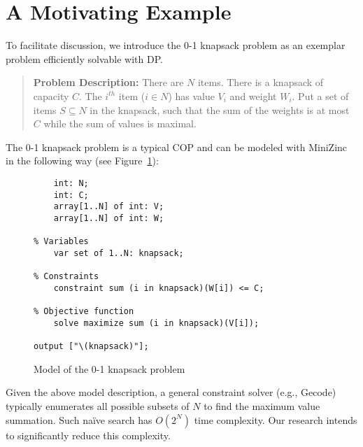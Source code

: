 \section{A Motivating Example}
	To facilitate discussion, we introduce the 0-1 knapsack problem as an exemplar problem efficiently solvable with DP. 
	
	
	\begin{quote}
		\textbf{Problem Description:} There are $N$ items. There is a knapsack of capacity $C$. The $i^{th}$ item ($i \in N$) has value $V_i$ and weight $W_i$. Put a set of items $S \subseteq N$ in the knapsack, such that the sum of the weights is at most $C$ while the sum of values is maximal.  
	\end{quote}
\noindent	
The 0-1 knapsack problem is a typical COP and can be modeled with MiniZinc in the following way (see Figure~\ref{fig:knapsack}): 
	\begin{figure}[htb]
\begin{lstlisting}[frame=single]
% Input arguments
    int: N;
    int: C;
    array[1..N] of int: V;
    array[1..N] of int: W;

% Variables
    var set of 1..N: knapsack;

% Constraints
    constraint sum (i in knapsack)(W[i]) <= C;

% Objective function
    solve maximize sum (i in knapsack)(V[i]);

output ["\(knapsack)"];
\end{lstlisting}
\caption{Model of the 0-1 knapsack problem}\label{fig:knapsack}
\end{figure}

\noindent    
Given the above model description, a general  constraint solver (e.g., Gecode) typically enumerates all possible subsets of $N$ to find the maximum value summation. Such na{\"i}ve search has $O(2^N)$ time complexity. Our research intends to significantly reduce this complexity. %
    
 